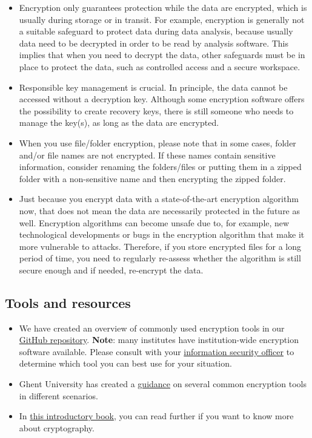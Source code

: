 \documentclass[
]{book}
\providecommand{\tightlist}{%
  \setlength{\itemsep}{0pt}\setlength{\parskip}{0pt}}
\begin{document}
\begin{itemize}
\tightlist
\item
  Encryption only guarantees protection while the data are encrypted, which is
  usually during storage or in transit. For example, encryption is generally not
  a suitable safeguard to protect data during data analysis, because usually
  data need to be decrypted in order to be read by analysis software. This implies
  that when you need to decrypt the data, other safeguards must be in place to
  protect the data, such as controlled access and a secure workspace.
\item
  Responsible key management is crucial. In principle, the data cannot be
  accessed without a decryption key. Although some encryption software offers the
  possibility to create recovery keys, there is still someone who needs to manage
  the key(s), as long as the data are encrypted.
\item
  When you use file/folder encryption, please note that in some cases, folder
  and/or file names are not encrypted. If these names contain sensitive
  information, consider renaming the folders/files or putting them in a zipped
  folder with a non-sensitive name and then encrypting the zipped folder.
\item
  Just because you encrypt data with a state-of-the-art encryption algorithm now,
  that does not mean the data are necessarily protected in the future as well.
  Encryption algorithms can become unsafe due to, for example, new technological
  developments or bugs in the encryption algorithm that make it more vulnerable
  to attacks. Therefore, if you store encrypted files for a long period of time,
  you need to regularly re-assess whether the algorithm is still secure enough
  and if needed, re-encrypt the data.
\end{itemize}

\hypertarget{encryption-resources}{%
\subsection{Tools and resources}\label{encryption-resources}}

\begin{itemize}
\tightlist
\item
  We have created an overview of commonly used encryption tools in our
  \href{https://github.com/UtrechtUniversity/privacy-engineering-tools/blob/main/secure-computing/encryption-tools.md}{GitHub repository}.
  \textbf{Note}: many institutes have institution-wide encryption software available.
  Please consult with your \protect\hyperlink{support}{information security officer} to determine
  which tool you can best use for your situation.
\item
  Ghent University has created a \href{https://osf.io/nx8km}{guidance}
  on several common encryption tools in different scenarios.
\item
  In \href{https://www.cs.unibo.it/babaoglu/courses/security/resources/documents/intro-to-crypto.pdf}{this introductory book},
  you can read further if you want to know more about cryptography.
\end{itemize}
\end{document}
